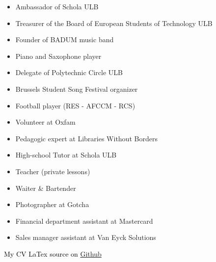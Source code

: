 
\vspace{1.5em}


\begin{itemize}
\item Ambassador of Schola ULB
\item Treasurer of the Board of European Students of Technology ULB
\item Founder of BADUM music band
\item Piano and Saxophone player
\item Delegate of Polytechnic Circle ULB
\item Brussels Student Song Festival organizer
\item Football player (RES - AFCCM - RCS)
\item Volunteer at Oxfam
\end{itemize}
\vspace{1.5em}

\vspace{1.5em}

\vspace{1.5em}

\vspace{1.5em}

\begin{itemize}
    \item Pedagogic expert at Libraries Without Borders
    \item High-school Tutor at Schola ULB
    \item Teacher (private lessons)
    \item Waiter \& Bartender
    \item Photographer at Gotcha
    \item Financial department assistant at Mastercard
    \item Sales manager assistant at Van Eyck Solutions
\end{itemize}

\vspace{4em}
\hspace{8em}\textcolor{black}{My CV LaTex source on}
\href{https://github.com/sachamedaer/CV}{Github}
\vspace{10em}